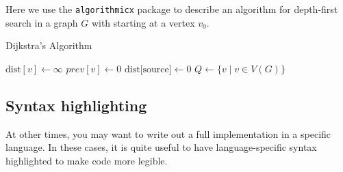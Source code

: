 \documentclass[11pt,letterpaper,titlepage]{article}
\numberwithin{equation}{section}
\numberwithin{figure}{section}
\numberwithin{table}{section}
\numberwithin{algorithm}{section}
\theoremstyle{definition}
\begin{document}
Here we use the \verb$algorithmicx$ package to describe an algorithm for depth-first search in a graph $G$ with starting at a vertex $v_0$.

\begin{algorithm}[H]
\caption{Dijkstra's Algorithm}\label{Dijkstra}
\begin{algorithmic}[1]
        \State $\text{dist}[v] \gets \infty$
        \State $\textit{prev}[v] \gets 0$
        \State $\text{dist[source]} \gets 0$
        \State $Q \gets \{v \mid v\in V(G)\}$
                \EndIf
            \EndFor
        \EndWhile
    \EndFor
    \EndProcedure
\end{algorithmic}
\end{algorithm}


 \subsection{Syntax highlighting}

 At other times, you may want to write out a full implementation in a specific language. In these cases, it is quite useful to have language-specific syntax highlighted to make code more legible.
\end{document}
